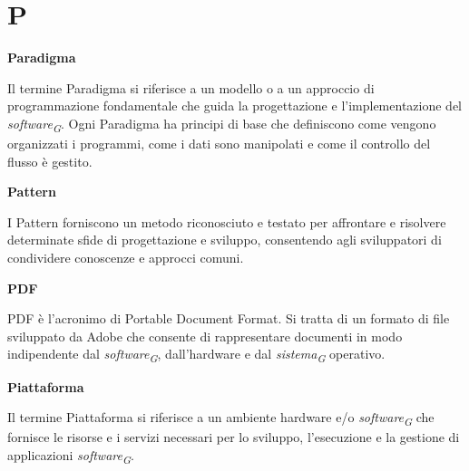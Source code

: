 \documentclass{article}
\begin{document}
\pagebreak
\section*{P}
{}

\vspace{0.4cm}

\textbf{Paradigma}

\vspace{0.1cm}

Il termine Paradigma si riferisce a un modello o a un approccio di programmazione fondamentale che guida la progettazione e l'implementazione del \textit{software}\textsubscript{\textit{G}}. Ogni Paradigma ha principi di base che definiscono come vengono organizzati i programmi, come i dati sono manipolati e come il controllo del flusso è gestito.

\vspace{0.4cm}

\textbf{Pattern}

\vspace{0.1cm}

I Pattern forniscono un metodo riconosciuto e testato per affrontare e risolvere determinate sfide di progettazione e sviluppo, consentendo agli sviluppatori di condividere conoscenze e approcci comuni.

\vspace{0.4cm}

\textbf{PDF}

\vspace{0.1cm}

PDF è l'acronimo di Portable Document Format. Si tratta di un formato di file sviluppato da Adobe che consente di rappresentare documenti in modo indipendente dal \textit{software}\textsubscript{\textit{G}}, dall'hardware e dal \textit{sistema}\textsubscript{\textit{G}} operativo.

\vspace{0.4cm}

\textbf{Piattaforma}

\vspace{0.1cm}

Il termine Piattaforma si riferisce a un ambiente hardware e/o \textit{software}\textsubscript{\textit{G}} che fornisce le risorse e i servizi necessari per lo sviluppo, l'esecuzione e la gestione di applicazioni \textit{software}\textsubscript{\textit{G}}.

\vspace{0.4cm}
\end{document}
